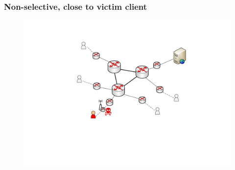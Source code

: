 

\begin{frame}
\frametitle{Non-selective, close to victim client}
\begin{block}{}
  \begin{figure}[t]
    \centering
    \includegraphics[scale=.5]{figures/scenario1-close-to-ap.pdf}
  \end{figure}
\end{block}
\end{frame}



